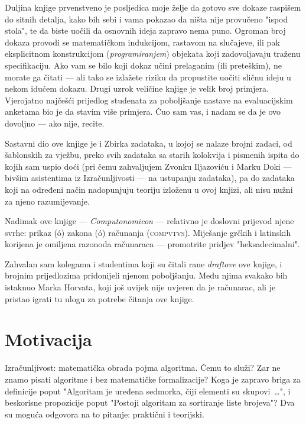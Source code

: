 Duljina knjige prvenstveno je posljedica moje želje da gotovo sve dokaze raspišem do sitnih detalja, kako bih sebi i vama pokazao da ništa nije provučeno "ispod stola", te da biste uočili da osnovnih ideja zapravo nema puno. Ogroman broj dokaza provodi se matematičkom indukcijom, rastavom na slučajeve, ili pak eksplicitnom konstrukcijom (\emph{programiranjem}) objekata koji zadovoljavaju traženu specifikaciju. Ako vam se bilo koji dokaz učini prelaganim (ili preteškim), ne morate ga čitati --- ali tako se izlažete riziku da propustite uočiti sličnu ideju u nekom idućem dokazu. Drugi uzrok veličine knjige je velik broj primjera. Vjerojatno najčešći prijedlog studenata za poboljšanje nastave na evaluacijskim anketama bio je da stavim više primjera. Čuo sam vas, i nadam se da je ovo dovoljno --- ako nije, recite.

Sastavni dio ove knjige je i Zbirka zadataka, u kojoj se nalaze brojni zadaci, od šablonskih za vježbu, preko svih zadataka sa starih kolokvija i pismenih ispita do kojih sam uspio doći (pri čemu zahvaljujem Zvonku Iljazoviću i Marku Doki --- bivšim asistentima iz Izračunljivosti --- na ustupanju zadataka), pa do zadataka koji na određeni način nadopunjuju teoriju izloženu u ovoj knjizi, ali nisu nužni za njeno razumijevanje.

Nadimak ove knjige --- \emph{Computonomicon} --- relativno je doslovni prijevod njene svrhe: prikaz ({\textgreekfont\textepsilon\textiota\textkappa\'o\textnu\textalpha}) zakona (\textnu\'o\textmugreek\textomikron\textvarsigma) računanja (\textsc{compvtvs}). Miješanje grčkih i latinskih korijena je omiljena razonoda računaraca --- promotrite pridjev "heksadecimalni".

Zahvalan sam kolegama i studentima koji su čitali rane \emph{draftove} ove knjige, i brojnim prijedlozima pridonijeli njenom poboljšanju. Među njima svakako bih istaknuo Marka Horvata, koji još uvijek nije uvjeren da je računarac, ali je pristao igrati tu ulogu za potrebe čitanja ove knjige.

\section{Motivacija}

Izračunljivost: matematička obrada pojma algoritma. Čemu to služi? Zar ne znamo pisati algoritme i bez matematičke formalizacije? Koga je zapravo briga za definicije poput "Algoritam je uređena sedmorka, čiji elementi su skupovi~\ldots", i beskorisne propozicije poput "Postoji algoritam za sortiranje liste brojeva"? Dva su moguća odgovora na to pitanje: praktični i teorijski.

